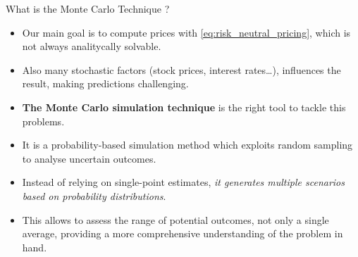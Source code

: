 \documentclass{beamer}
\begin{document}
\begin{frame}{What is the Monte Carlo Technique ?}
\begin{itemize}
	\item Our main goal is to compute prices with \cref{eq:risk_neutral_pricing}, which is not always analitycally solvable.
	\item Also many stochastic factors (stock prices, interest rates\ldots), influences the result, making predictions challenging. 
	\item \textbf{The Monte Carlo simulation technique} is the right tool to tackle this problems.
	\item It is a probability-based simulation method which exploits random sampling to analyse uncertain outcomes.
	\item Instead of relying on single-point estimates, \emph{it generates multiple scenarios based on probability distributions}. 
	\item This allows to assess the range of potential outcomes, not only a single average, providing a more comprehensive understanding of the problem in hand.
\end{itemize}
\end{frame}
\end{document}
